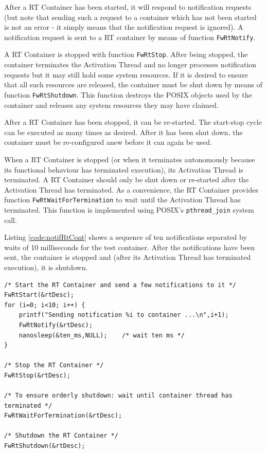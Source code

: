 \documentclass[manual]{../fwprofile}
\begin{document}
After a RT Container has been started, it will respond to notification requests (but note that sending such a request to a container which has not been started is not an error - it simply means that the notification request is ignored). A notification request is sent to a RT container by means of function \texttt{FwRtNotify}. 

A RT Container is stopped with function \texttt{FwRtStop}. After being stopped, the container terminates the Activation Thread and no longer processes notification requests but it may still hold some system resources. If it is desired to ensure that all such resources are released, the container must be shut down by means of function \texttt{FwRtShutdown}. This function destroys the POSIX objects used by the container and releases any system resources they may have claimed.

After a RT Container has been stopped, it can be re-started. The start-stop cycle can be executed as many times as desired. After it has been shut down, the container must be re-configured anew before it can again be used.

When a RT Container is stopped (or when it terminates autonomously because its functional behaviour has terminated execution), its Activation Thread is terminated. A RT Container should only be shut down or re-started after the Activation Thread has terminated. As a convenience, the RT Container provides function \texttt{FwRtWaitForTermination} to wait until the Activation Thread has terminated. This function is implemented using POSIX's \texttt{pthread\_join} system call.

Listing \ref{code:notifRtCont} shows a sequence of ten notifications separated by waits of 10 milliseconds for the test container. After the notifications have been sent, the container is stopped and (after its Activation Thread has terminated execution), it is shutdown.

\begin{lstlisting}
/* Start the RT Container and send a few notifications to it */
FwRtStart(&rtDesc);
for (i=0; i<10; i++) {
	printf("Sending notification %i to container ...\n",i+1);
	FwRtNotify(&rtDesc);
	nanosleep(&ten_ms,NULL);	/* wait ten ms */
}

/* Stop the RT Container */
FwRtStop(&rtDesc);

/* To ensure orderly shutdown: wait until container thread has terminated */
FwRtWaitForTermination(&rtDesc);

/* Shutdown the RT Container */
FwRtShutdown(&rtDesc);
\end{lstlisting}
\end{document}
